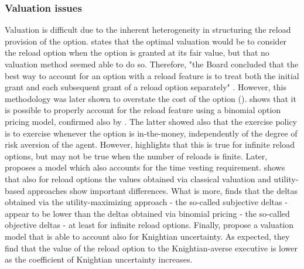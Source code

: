 \subsubsection{Valuation issues}
    Valuation is difficult due to the inherent heterogeneity in structuring the reload provision of the option. \cite{fasb123} states that the optimal valuation would be to consider the reload option when the option is granted at its fair value, but that no valuation method seemed able to do so. Therefore, "the Board concluded that the best way to account for an option with a reload feature is to treat both the initial grant and each subsequent grant of a reload option separately" \cite{fasb123}. However, this methodology was later shown to overstate the cost of the option (\cite{ingersoll2006valuing}). \cite{saly1999valuing} shows that it is possible to properly account for the reload feature using a binomial option pricing model, confirmed also by \cite{hemmer2000reload}. The latter showed also that the exercise policy is to exercise whenever the option is in-the-money, independently of the degree of risk aversion of the agent. However, \cite{saly1998ignoring} highlights that this is true for infinite reload options, but may not be true when the number of reloads is finite. Later, \cite{dai2005valuing} proposes a model which also accounts for the time vesting requirement.
    \cite{lau2005valuation} shows that also for reload options the values obtained via classical valuation and utility-based approaches show important differences. What is more, \cite{ingersoll2006valuing} finds that the deltas obtained via the utility-maximizing approach - the so-called subjective deltas - appear to be lower than the deltas obtained via binomial pricing - the so-called objective deltas - at least for infinite reload options. Finally, \cite{zhang2010knightian} propose a valuation model that is able to account also for Knightian uncertainty. As expected, they find that the value of the reload option to the Knightian-averse executive is lower as the coefficient of Knightian uncertainty increases.

    


